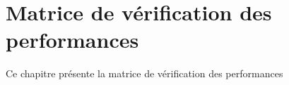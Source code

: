 


\chapter{Matrice de vérification des performances}
Ce chapitre présente la matrice de vérification des performances

%

